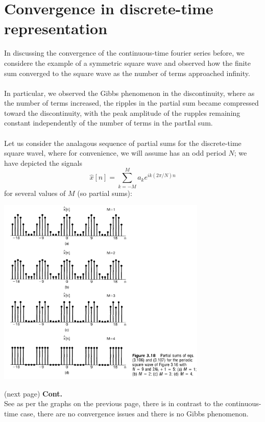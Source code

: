 \documentclass{report}
\begin{document}
\section{Convergence in discrete-time\\representation}
In discussing the convergence of the continuous-time fourier series before, we considere the example of a symmetric square wave and observed how the finite sum converged to the square wave as the number
of terms approached infinity.\\
\vspace{1mm}\\
In particular, we observed the Gibbs phenomenon in the discontinuity, where as the number of terms increased, the ripples in the partial sum became compressed toward the discontinuity, with the peak
amplitude of the rupples remaining constant independently of the number of terms in the partIal sum.\\
\vspace{1mm}\\
Let us consider the analagous sequence of partial sums for the discrete-time square wavel, where for convenience, we will assume has an odd period $N$; we have depicted the signals
\begin{equation*}
\hat{x}[n]=\sum^M_{k=-M}a_ke^{ik(2\pi/N)n}
\end{equation*}
for several values of $M$ (so partial sums):
\begin{center}
\includegraphics[width=10cm]{a64}
\end{center}
(next page)\newpage
\noindent\textbf{Cont.}\\
See as per the graphs on the previous page, there is in contrast to the continuous-time case, there are no convergence issues and there is no Gibbs phenomenon.\\
\end{document}
